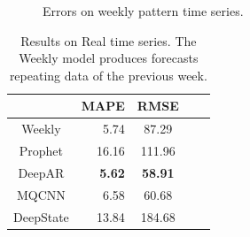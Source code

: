 \documentclass[a4paper, 12pt]{article} %
\newcommand{\ra}[1]{\renewcommand{\arraystretch}{#1}}
\begin{document}
	
	\begin{figure}\centering
		 \hfill
		
		\caption{Errors on weekly pattern time series.}
		\label{fig:results_forecasting_bank}
	\end{figure}
	
	\begin{table}\centering 
		\ra{1.3}
		\begin{tabular}{@{}crcrc@{}}
			\midrule
			& MAPE & RMSE\\
			\midrule
			Weekly & 5.74 & 87.29\\
			Prophet & 16.16 & 111.96\\
			DeepAR & \textbf{5.62} & \textbf{58.91}\\
			MQCNN & 6.58 & 60.68\\
			DeepState & 13.84 & 184.68\\
			\bottomrule
		\end{tabular}
		\caption{Results on Real time series. The Weekly model produces forecasts repeating data of the previous week.} \label{table:results_forecasting_bank}
	\end{table}
	
\end{document}
